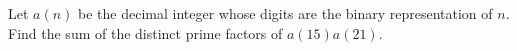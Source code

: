 Let $a(n)$ be the decimal integer whose digits are the binary representation of $n$. Find the sum of the distinct prime factors of $a(15)a(21)$.
